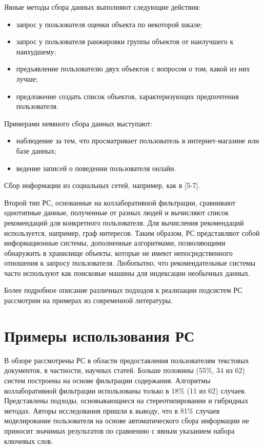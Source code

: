 \documentclass[a4paper,14pt,openany,final]{extreport} %
\begin{document}
Явные методы сбора данных выполняют следующие действия:
\begin{itemize}
\item запрос у пользователя оценки объекта по некоторой шкале;
\item запрос у пользователя ранжировки группы объектов от наилучшего к наихудшему;
\item предъявление пользователю двух объектов с вопросом о том, какой из них лучше;
\item предложение создать список объектов, характеризующих предпочтения пользователя.
\end{itemize}
Примерами неявного сбора данных выступают:

\begin{itemize}
\item наблюдение за тем, что просматривает пользователь в
  интернет-магазине или базе данных;
\item ведение записей о поведении
  пользователя онлайн.
\end{itemize}
Сбор информации из социальных сетей, например, как в [5-7].

Второй тип РС, основанные на коллаборативной фильтрации, сравнивают однотипные данные, полученные от разных людей и вычисляют список рекомендаций для конкретного пользователя. Для вычисления рекомендаций используется, например, граф интересов. Таким образом, РС представляют собой информационные системы, дополненные алгоритмами, позволяющими обнаружить в хранилище объекты, которые не имеют непосредственного отношения к запросу пользователя. Любопытно, что рекомендательные системы часто используют как поисковые машины для индексации необычных данных.

Более подробное описание различных подходов к реализации подсистем РС рассмотрим на примерах из современной литературы.

\section{Примеры использования РС}
\label{sec:rs-examples}

В обзоре \cite{b8} рассмотрены РС в области предоставления пользователям текстовых документов, в частности, научных статей. Больше половины (55\%, 34 из 62) систем построены на основе фильтрации содержания. Алгоритмы коллаборативной фильтрации использованы только в 18\% (11 из 62) случаев. Представлены подходы, основывающиеся на стереотипировании и гибридных методах. Авторы исследования пришли к выводу, что в 81\% случаев моделирование пользователя на основе автоматического сбора информации не приносит значимых результатов по сравнению с явным указанием набора ключевых слов.
\end{document}
